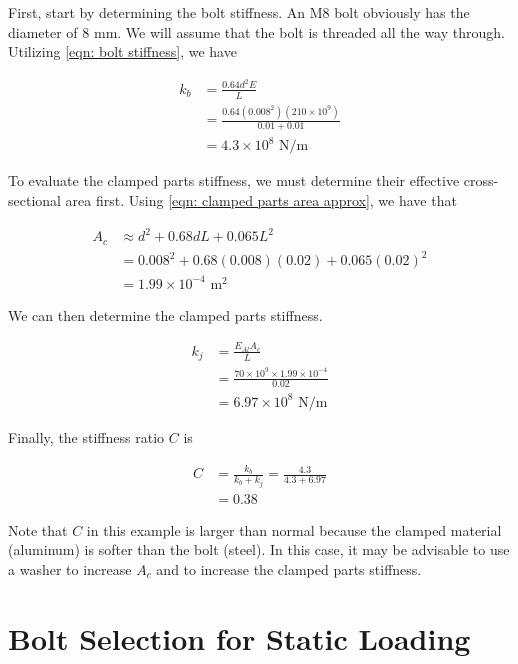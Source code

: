 \documentclass[
10pt,
a4paper,
openany,
svgnames,
]{book}
\begin{document}
\begin{solution}
  First, start by determining the bolt stiffness. An M8 bolt obviously has the diameter of 8 mm. We will assume that the bolt is threaded all the way through. Utilizing \cref{eqn: bolt stiffness}, we have

  \begin{align*}
    k_b &= \frac{0.64d^2E}{L} \\
        &= \frac{0.64 (0.008^2)(210 \times 10^9)}{0.01+0.01} \\
        &= 4.3 \times 10^8 \text{ N/m}
  \end{align*}
  
  To evaluate the clamped parts stiffness, we must determine their effective cross-sectional area first. Using \cref{eqn: clamped parts area approx}, we have that

  \begin{align*}
    A_c &\approx d^2 + 0.68dL + 0.065L^2 \\
        &= 0.008^2 + 0.68(0.008)(0.02) + 0.065(0.02)^2 \\
        &= 1.99 \times 10^{-4} \text{ m}^2
  \end{align*}

  We can then determine the clamped parts stiffness.

  \begin{align*}
    k_j &= \frac{E_{Al}A_c}{L} \\
        &= \frac{70 \times 10^9 \times 1.99 \times 10^{-4}}{0.02} \\
        &= 6.97 \times 10^8 \text{ N/m}
  \end{align*}

  Finally, the stiffness ratio $C$ is

  \begin{align*}
    C & = \frac{k_b}{k_b + k_j} = \frac{4.3}{4.3 + 6.97} \\
      &= 0.38
  \end{align*}

  Note that $C$ in this example is larger than normal because the clamped material (aluminum) is softer than the bolt (steel). In this case, it may be advisable to use a washer to increase $A_c$ and to increase the clamped parts stiffness.
\end{solution}


\section{Bolt Selection for Static Loading}
\end{document}
